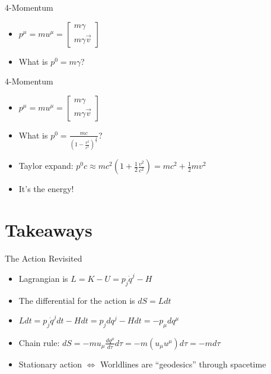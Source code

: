 \documentclass[10pt,xcolor={table,dvipsnames},t]{beamer}
\begin{document}
\begin{frame}{4-Momentum}
    \begin{itemize}
        \item $p^\mu = m u^\mu = \begin{bmatrix} m\gamma \\ m\gamma \vec{v} \end{bmatrix}$
        \item What is $p^0 = m\gamma$?
    \end{itemize}
\end{frame}

\begin{frame}{4-Momentum}
    \begin{itemize}
        \item $p^\mu = m u^\mu = \begin{bmatrix} m\gamma \\ m\gamma \vec{v} \end{bmatrix}$
        \item What is $p^0 = \frac{mc}{\left(1-\frac{v^2}{c^2}\right)^{\frac{1}{2}}}$?
        \item Taylor expand: $p^0c \approx mc^2(1+\frac{1}{2}\frac{v^2}{c^2}) = mc^2 + \frac{1}{2}mv^2$
        \item It's the energy!
    \end{itemize}
\end{frame}

\section{Takeaways}

\begin{frame}{The Action Revisited}
    \begin{itemize}
        \item Lagrangian is $L = K-U = p_j \dot{q}^j - H$
        \item The differential for the action is $dS = Ldt$
        \item $Ldt = p_j \dot{q}^jdt - Hdt = p_j dq^j - Hdt = -p_\mu dq^\mu$
        \item Chain rule: $dS = -mu_\mu \frac{dq^\mu}{d\tau}d\tau = -m(u_\mu u^\mu) d\tau = -md\tau$
        \item Stationary action $\iff$ Worldlines are ``geodesics'' through spacetime
    \end{itemize}
\end{frame}
\end{document}
